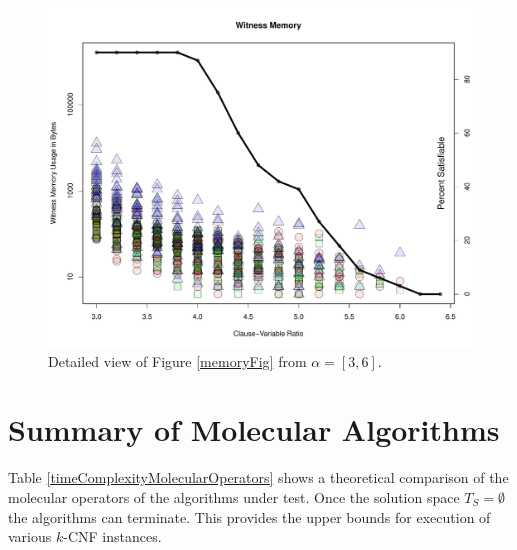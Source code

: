 \begin{figure}[htdp]
\begin{center}

\includegraphics[width=1.1\textwidth]{./figures/plotImage/memory3-6_2.pdf}

\caption{Detailed view of Figure \ref{memoryFig} from $\alpha = [3,6]$. }
\label{memoryFigDetail}
\end{center}
\end{figure}


\FloatBarrier

	\section{Summary of Molecular Algorithms}

		Table \ref{timeComplexityMolecularOperators} shows a theoretical comparison of the molecular operators of the algorithms under test.  Once the solution space $T_S = \emptyset$ the algorithms can terminate.  This provides the upper bounds for execution of various $k$-CNF instances.  
		
